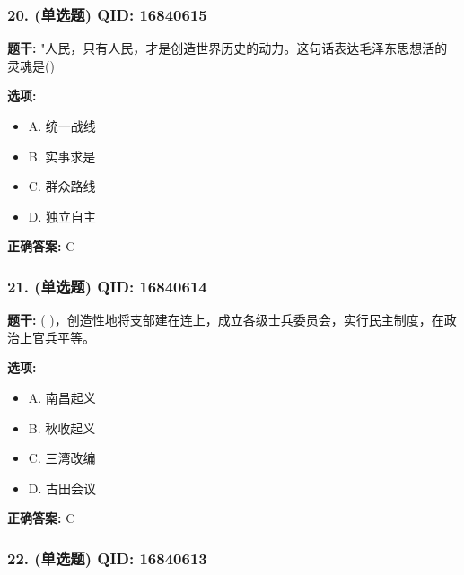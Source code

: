 \documentclass[12pt,UTF8]{ctexart}
\begin{document}
\subsubsection*{20. (单选题) \small QID: 16840615}

\textbf{题干:}
"人民，只有人民，才是创造世界历史的动力。这句话表达毛泽东思想活的灵魂是()

\textbf{选项:}
\begin{itemize}[leftmargin=*]

  \item A. 统一战线

  \item B. 实事求是

  \item C. 群众路线

  \item D. 独立自主

\end{itemize}

\textbf{正确答案:}
C

\vspace{0.3em}\hrulefill\vspace{0.7em}

\subsubsection*{21. (单选题) \small QID: 16840614}

\textbf{题干:}
( )，创造性地将支部建在连上，成立各级士兵委员会，实行民主制度，在政治上官兵平等。

\textbf{选项:}
\begin{itemize}[leftmargin=*]

  \item A. 南昌起义

  \item B. 秋收起义

  \item C. 三湾改编

  \item D. 古田会议

\end{itemize}

\textbf{正确答案:}
C

\vspace{0.3em}\hrulefill\vspace{0.7em}

\subsubsection*{22. (单选题) \small QID: 16840613}
\end{document}
